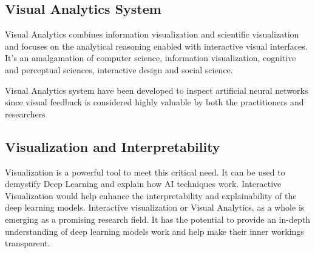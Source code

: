 \subsection{Visual Analytics System}
    
Visual Analytics combines information visualization and scientific visualization and focuses on the analytical reasoning enabled with interactive visual interfaces. It’s an amalgamation of computer science, information visualization, cognitive and perceptual sciences, interactive design and social science.

Visual Analytics system have been developed to inspect artificial neural networks since visual feedback is considered highly valuable by both the practitioners and researchers


\subsection{Visualization and Interpretability}

Visualization is a powerful tool to meet this critical need. It can be used to demystify Deep Learning and explain how AI techniques work. Interactive Visualization would help enhance the interpretability and explainability of the deep learning models. Interactive visualization or Visual Analytics, as a whole is emerging as a promising research field. It has the potential to provide an in-depth understanding of deep learning models work and help make their inner workings transparent.

